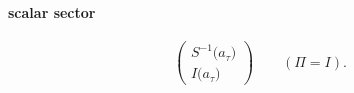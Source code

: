 \paragraph{scalar sector}
\[\begin{pmatrix}S^{-1}\bigl(a_{\tau}\bigr)\\I\bigl(a_{\tau}\bigr)\end{pmatrix}\qquad(\Pi=I).\]

